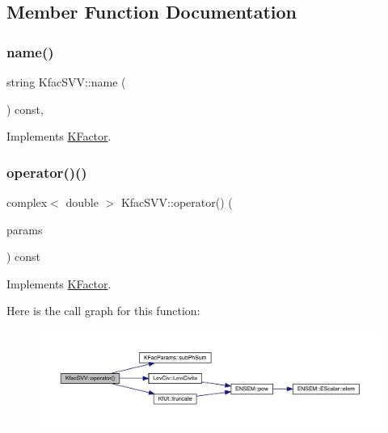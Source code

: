 \subsection{Member Function Documentation}
\mbox{\label{classKfacSVV_ad7ab40ec924a678cd785a9743e676d6c}} 
\subsubsection{\texorpdfstring{name()}{name()}}
{\footnotesize\ttfamily string Kfac\+S\+V\+V\+::name (\begin{DoxyParamCaption}{ }\end{DoxyParamCaption}) const\hspace{0.3cm}{\ttfamily [inline]}, {\ttfamily [virtual]}}



Implements \mbox{\hyperlink{classKFactor_ae578f8d6e4b525895427717da99cab6c}{K\+Factor}}.

\mbox{\label{classKfacSVV_abc4b565ae1fbf1109bbed4b05b3d5ee7}} 
\subsubsection{\texorpdfstring{operator()()}{operator()()}}
{\footnotesize\ttfamily complex$<$ double $>$ Kfac\+S\+V\+V\+::operator() (\begin{DoxyParamCaption}\item[{const \mbox{\hyperlink{classKFacParams}{K\+Fac\+Params}} \&}]{params }\end{DoxyParamCaption}) const\hspace{0.3cm}{\ttfamily [virtual]}}



Implements \mbox{\hyperlink{classKFactor_a4273897de4ef590083c7ef208b8d0f18}{K\+Factor}}.

Here is the call graph for this function\+:\nopagebreak
\begin{figure}[H]
\begin{center}
\leavevmode
\includegraphics[width=350pt]{d3/d61/classKfacSVV_abc4b565ae1fbf1109bbed4b05b3d5ee7_cgraph}
\end{center}
\end{figure}


